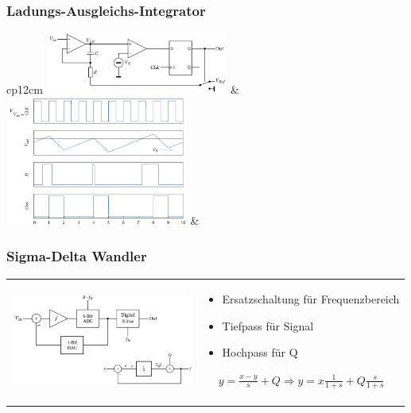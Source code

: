 \subsubsection{Ladungs-Ausgleichs-Integrator }
\begin{tabular}{cp{12cm}}
  \includegraphics[width=6cm, valign=t]{pictures/lsg1}
  &
  \\ 
  \includegraphics[width=6cm, valign=t]{pictures/lsg2}
  & \\
\end{tabular}


\subsubsection{Sigma-Delta Wandler }
\begin{tabular}{cp{12cm}}
  \includegraphics[width=6cm, valign=t]{pictures/deltaSigma1}
  &
  {\begin{itemize}
      \item Ersatzschaltung für Frequenzbereich
      \item Tiefpass für Signal
      \item Hochpass für Q
    \end{itemize}
    \begin{align*}
      y=\frac{x-y}{s}+Q\Rightarrow y=x\frac{1}{1+s}+Q\frac{s}{1+s}
    \end{align*}
  }\\
\end{tabular}


